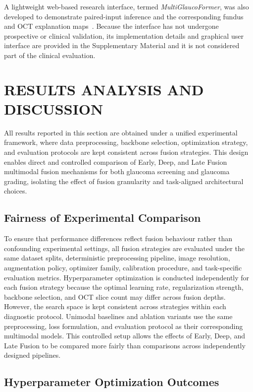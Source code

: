 \documentclass[preprint,12pt]{elsarticle}
\begin{document}
A lightweight web-based research interface, termed \textit{MultiGlaucoFormer}, was also developed to demonstrate paired-input inference and the corresponding fundus and OCT explanation maps~\cite{multiglaucoformer_webapp}. Because the interface has not undergone prospective or clinical validation, its implementation details and graphical user interface are provided in the Supplementary Material and it is not considered part of the clinical evaluation.



\section{RESULTS ANALYSIS AND DISCUSSION}
\label{sec4}

All results reported in this section are obtained under a unified experimental framework, where data preprocessing, backbone selection, optimization strategy, and evaluation protocols are kept consistent across fusion strategies. This design enables direct and controlled comparison of Early, Deep, and Late Fusion multimodal fusion mechanisms for both glaucoma screening and glaucoma grading, isolating the effect of fusion granularity and task-aligned architectural choices.

\subsection{Fairness of Experimental Comparison}
\label{subsec:fairness_protocol}

To ensure that performance differences reflect fusion behaviour rather than confounding experimental settings, all fusion strategies are evaluated under the same dataset splits, deterministic preprocessing pipeline, image resolution, augmentation policy, optimizer family, calibration procedure, and task-specific evaluation metrics. Hyperparameter optimization is conducted independently for each fusion strategy because the optimal learning rate, regularization strength, backbone selection, and OCT slice count may differ across fusion depths. However, the search space is kept consistent across strategies within each diagnostic protocol. Unimodal baselines and ablation variants use the same preprocessing, loss formulation, and evaluation protocol as their corresponding multimodal models. This controlled setup allows the effects of Early, Deep, and Late Fusion to be compared more fairly than comparisons across independently designed pipelines.

\subsection{Hyperparameter Optimization Outcomes}
\label{subsec:hpo-results}
\end{document}

